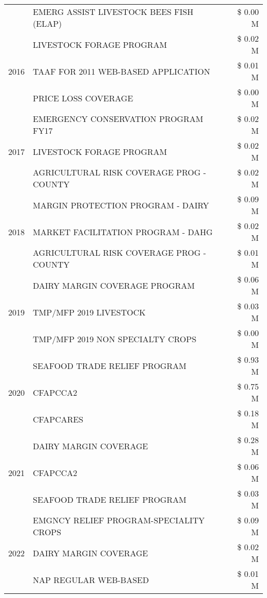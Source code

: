 \begin{tabular}{llr}
 & EMERG ASSIST LIVESTOCK BEES FISH (ELAP) & \$ 0.00 M \\
\cline{1-3}
\multirow[t]{3}{*}{2016} & LIVESTOCK FORAGE PROGRAM & \$ 0.02 M \\
 & TAAF FOR 2011 WEB-BASED APPLICATION & \$ 0.01 M \\
 & PRICE LOSS COVERAGE & \$ 0.00 M \\
\cline{1-3}
\multirow[t]{3}{*}{2017} & EMERGENCY CONSERVATION PROGRAM FY17 & \$ 0.02 M \\
 & LIVESTOCK FORAGE PROGRAM & \$ 0.02 M \\
 & AGRICULTURAL RISK COVERAGE PROG - COUNTY & \$ 0.02 M \\
\cline{1-3}
\multirow[t]{3}{*}{2018} & MARGIN PROTECTION PROGRAM - DAIRY & \$ 0.09 M \\
 & MARKET FACILITATION PROGRAM - DAHG & \$ 0.02 M \\
 & AGRICULTURAL RISK COVERAGE PROG - COUNTY & \$ 0.01 M \\
\cline{1-3}
\multirow[t]{3}{*}{2019} & DAIRY MARGIN COVERAGE PROGRAM & \$ 0.06 M \\
 & TMP/MFP 2019 LIVESTOCK & \$ 0.03 M \\
 & TMP/MFP 2019 NON SPECIALTY CROPS & \$ 0.00 M \\
\cline{1-3}
\multirow[t]{3}{*}{2020} & SEAFOOD TRADE RELIEF PROGRAM & \$ 0.93 M \\
 & CFAPCCA2 & \$ 0.75 M \\
 & CFAPCARES & \$ 0.18 M \\
\cline{1-3}
\multirow[t]{3}{*}{2021} & DAIRY MARGIN COVERAGE & \$ 0.28 M \\
 & CFAPCCA2 & \$ 0.06 M \\
 & SEAFOOD TRADE RELIEF PROGRAM & \$ 0.03 M \\
\cline{1-3}
\multirow[t]{3}{*}{2022} & EMGNCY RELIEF PROGRAM-SPECIALITY CROPS & \$ 0.09 M \\
 & DAIRY MARGIN COVERAGE & \$ 0.02 M \\
 & NAP REGULAR WEB-BASED & \$ 0.01 M \\
\cline{1-3}
\bottomrule
\end{tabular}
